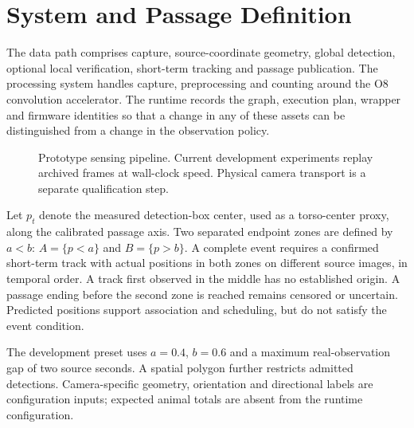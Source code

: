 \documentclass[journal]{IEEEtran}
\begin{document}
\section{System and Passage Definition}
The data path comprises capture, source-coordinate geometry, global detection, optional local verification, short-term tracking and passage publication. The processing system handles capture, preprocessing and counting around the O8 convolution accelerator. The runtime records the graph, execution plan, wrapper and firmware identities so that a change in any of these assets can be distinguished from a change in the observation policy.

\begin{figure}[!t]
\centering
{}
\caption{Prototype sensing pipeline. Current development experiments replay archived frames at wall-clock speed. Physical camera transport is a separate qualification step.}
\label{fig:pipeline}
\end{figure}

Let $p_t$ denote the measured detection-box center, used as a torso-center proxy, along the calibrated passage axis. Two separated endpoint zones are defined by $a<b$: $A=\{p<a\}$ and $B=\{p>b\}$. A complete event requires a confirmed short-term track with actual positions in both zones on different source images, in temporal order. A track first observed in the middle has no established origin. A passage ending before the second zone is reached remains censored or uncertain. Predicted positions support association and scheduling, but do not satisfy the event condition.

The development preset uses $a=0.4$, $b=0.6$ and a maximum real-observation gap of two source seconds. A spatial polygon further restricts admitted detections. Camera-specific geometry, orientation and directional labels are configuration inputs; expected animal totals are absent from the runtime configuration.
\end{document}

